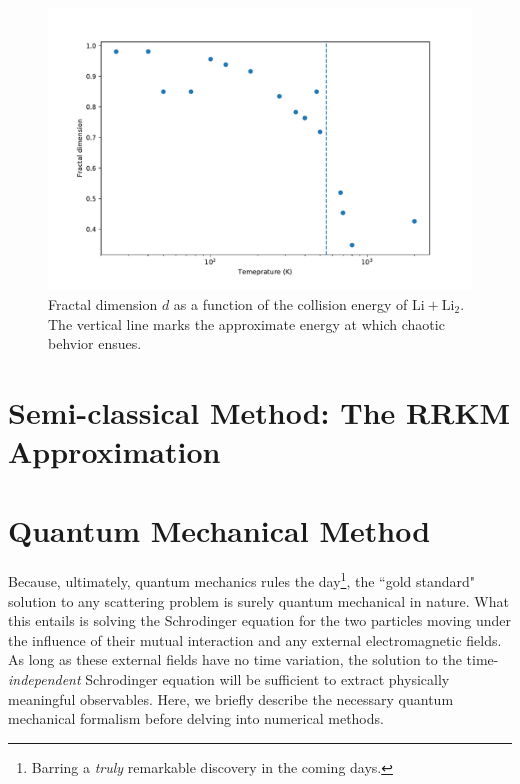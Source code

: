 \documentclass[%
 reprint,
 amsmath,amssymb,
 aps,
 nofootinbib
]{revtex4-1}
\begin{document}
\begin{figure}[ht]
\begin{center}
\includegraphics[width=1.125\linewidth]{fractal_dim.pdf}
\caption{Fractal dimension $d$ as a function of the collision energy of $\mathrm{Li} + \mathrm{Li_2}$. The vertical line marks the approximate energy at which chaotic behvior ensues.}
\label{fig:frac_dim}
\end{center}
\end{figure}

 

\section{\label{sec:RRKM}Semi-classical Method: The RRKM Approximation}

\section{\label{sec:QuantumTraj}Quantum Mechanical Method}
Because, ultimately, quantum mechanics rules the day\footnote{Barring a \textit{truly} remarkable discovery in the coming days.}, the ``gold standard" solution to any scattering problem is surely quantum mechanical in nature. What this entails is solving the Schrodinger equation for the two particles moving under the influence of their mutual interaction and any external electromagnetic fields. As long as these external fields have no time variation, the solution to the time-\textit{independent} Schrodinger equation will be sufficient to extract physically meaningful observables. Here, we briefly describe the necessary quantum mechanical formalism before delving into numerical methods.
\end{document}
